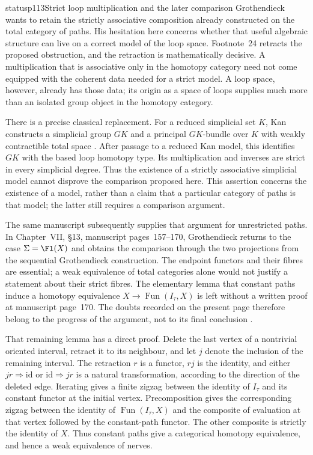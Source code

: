 \begin{dcomment}{status}{p113}{Strict loop multiplication and the later comparison}
Grothendieck wants to retain the strictly associative composition already constructed on the total category of paths.  His hesitation here concerns whether that useful algebraic structure can live on a correct model of the loop space.  Footnote~24 retracts the proposed obstruction, and the retraction is mathematically decisive.  A multiplication that is associative only in the homotopy category need not come equipped with the coherent data needed for a strict model.  A loop space, however, already has those data; its origin as a space of loops supplies much more than an isolated group object in the homotopy category.

There is a precise classical replacement.  For a reduced simplicial set $K$, Kan constructs a simplicial group $GK$ and a principal $GK$-bundle over $K$ with weakly contractible total space \citep[Definition~6.3 and Theorem~7.1]{Kan1958Combinatorial}.  After passage to a reduced Kan model, this identifies $GK$ with the based loop homotopy type.  Its multiplication and inverses are strict in every simplicial degree.  Thus the existence of a strictly associative simplicial model cannot disprove the comparison proposed here.  This assertion concerns the existence of a model, rather than a claim that a particular category of paths is that model; the latter still requires a comparison argument.

The same manuscript subsequently supplies that argument for unrestricted paths.  In Chapter~VII, \S13, manuscript pages~157--170, Grothendieck returns to the case $\Sigma=\Fl(X)$ and obtains the comparison through the two projections from the sequential Grothendieck construction.  The endpoint functors and their fibres are essential; a weak equivalence of total categories alone would not justify a statement about their strict fibres.  The elementary lemma that constant paths induce a homotopy equivalence $X\to\operatorname{Fun}(I_\tau,X)$ is left without a written proof at manuscript page~170.  The doubts recorded on the present page therefore belong to the progress of the argument, not to its final conclusion \citep[Ch.~VII, \S13]{GrothendieckDerivateursVII}.

That remaining lemma has a direct proof.  Delete the last vertex of a nontrivial oriented interval, retract it to its neighbour, and let $j$ denote the inclusion of the remaining interval.  The retraction $r$ is a functor, $rj$ is the identity, and either $jr\Rightarrow\mathrm{id}$ or $\mathrm{id}\Rightarrow jr$ is a natural transformation, according to the direction of the deleted edge.  Iterating gives a finite zigzag between the identity of $I_\tau$ and its constant functor at the initial vertex.  Precomposition gives the corresponding zigzag between the identity of $\operatorname{Fun}(I_\tau,X)$ and the composite of evaluation at that vertex followed by the constant-path functor.  The other composite is strictly the identity of $X$.  Thus constant paths give a categorical homotopy equivalence, and hence a weak equivalence of nerves.


\end{dcomment}
